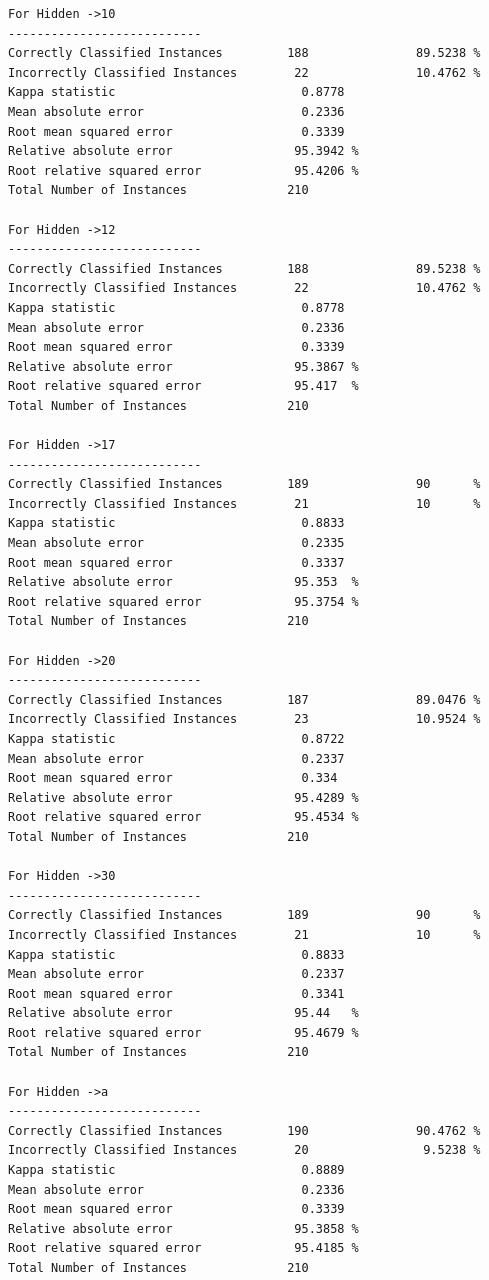 \documentclass[fontsize=10pt,DIV=14]{scrartcl}
\begin{document}
\begin{itemize}
\begin{verbatim}
For Hidden ->10 
---------------------------
Correctly Classified Instances         188               89.5238 %
Incorrectly Classified Instances        22               10.4762 %
Kappa statistic                          0.8778
Mean absolute error                      0.2336
Root mean squared error                  0.3339
Relative absolute error                 95.3942 %
Root relative squared error             95.4206 %
Total Number of Instances              210     

For Hidden ->12 
---------------------------
Correctly Classified Instances         188               89.5238 %
Incorrectly Classified Instances        22               10.4762 %
Kappa statistic                          0.8778
Mean absolute error                      0.2336
Root mean squared error                  0.3339
Relative absolute error                 95.3867 %
Root relative squared error             95.417  %
Total Number of Instances              210     

For Hidden ->17 
---------------------------
Correctly Classified Instances         189               90      %
Incorrectly Classified Instances        21               10      %
Kappa statistic                          0.8833
Mean absolute error                      0.2335
Root mean squared error                  0.3337
Relative absolute error                 95.353  %
Root relative squared error             95.3754 %
Total Number of Instances              210     

For Hidden ->20 
---------------------------
Correctly Classified Instances         187               89.0476 %
Incorrectly Classified Instances        23               10.9524 %
Kappa statistic                          0.8722
Mean absolute error                      0.2337
Root mean squared error                  0.334 
Relative absolute error                 95.4289 %
Root relative squared error             95.4534 %
Total Number of Instances              210     

For Hidden ->30 
---------------------------
Correctly Classified Instances         189               90      %
Incorrectly Classified Instances        21               10      %
Kappa statistic                          0.8833
Mean absolute error                      0.2337
Root mean squared error                  0.3341
Relative absolute error                 95.44   %
Root relative squared error             95.4679 %
Total Number of Instances              210     

For Hidden ->a 
---------------------------
Correctly Classified Instances         190               90.4762 %
Incorrectly Classified Instances        20                9.5238 %
Kappa statistic                          0.8889
Mean absolute error                      0.2336
Root mean squared error                  0.3339
Relative absolute error                 95.3858 %
Root relative squared error             95.4185 %
Total Number of Instances              210     


\end{verbatim}
\end{itemize}
\end{document}
